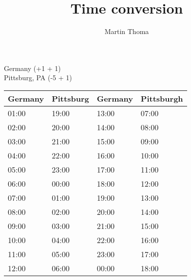 \documentclass[a4paper]{scrartcl}
\title{Time conversion}
\author{Martin Thoma}
\begin{document}
Germany (+1 + 1)\\
Pittsburg, PA (-5 + 1)\\
\begin{table}[htp]
    \begin{tabular}{ll||ll}
    Germany & Pittsburg & Germany & Pittsburgh \\ \hline
    \cellcolor{red!25} 01:00     & \cellcolor{green!25} 19:00   & \cellcolor{green!25} 13:00     & \cellcolor{yellow!25} 07:00      \\
    \cellcolor{red!25} 02:00     & \cellcolor{green!25} 20:00   & \cellcolor{green!25} 14:00     & \cellcolor{yellow!25} 08:00      \\
    \cellcolor{red!25} 03:00     & \cellcolor{green!25} 21:00   & \cellcolor{green!25} 15:00     & \cellcolor{green!25} 09:00      \\
    \cellcolor{red!25} 04:00     & \cellcolor{green!25} 22:00   & \cellcolor{green!25} 16:00     & \cellcolor{green!25} 10:00      \\
    \cellcolor{red!25} 05:00     & \cellcolor{yellow!25} 23:00  & \cellcolor{green!25} 17:00     & \cellcolor{green!25} 11:00      \\
    \cellcolor{yellow!25} 06:00  & \cellcolor{yellow!25} 00:00  & \cellcolor{green!25} 18:00     & \cellcolor{green!25} 12:00      \\
    \cellcolor{yellow!25} 07:00  & \cellcolor{red!25} 01:00     & \cellcolor{green!25} 19:00     & \cellcolor{green!25} 13:00      \\
    \cellcolor{yellow!25} 08:00  & \cellcolor{red!25} 02:00     & \cellcolor{green!25} 20:00     & \cellcolor{green!25} 14:00      \\
    \cellcolor{green!25} 09:00   & \cellcolor{red!25} 03:00     & \cellcolor{green!25} 21:00     & \cellcolor{green!25} 15:00      \\
    \cellcolor{green!25} 10:00   & \cellcolor{red!25} 04:00     & \cellcolor{green!25} 22:00     & \cellcolor{green!25} 16:00      \\
    \cellcolor{green!25} 11:00   & \cellcolor{red!25} 05:00     & \cellcolor{yellow!25} 23:00    & \cellcolor{green!25} 17:00      \\
    \cellcolor{green!25} 12:00   & \cellcolor{yellow!25} 06:00  & \cellcolor{yellow!25} 00:00    & \cellcolor{green!25} 18:00      \\
    \end{tabular}
\end{table}
\end{document}

